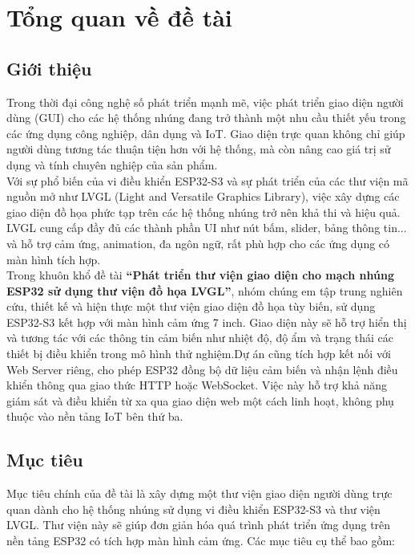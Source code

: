\chapter{Tổng quan về đề tài}
\section{Giới thiệu}
\tab Trong thời đại công nghệ số phát triển mạnh mẽ, việc phát triển giao diện người dùng (GUI) cho các hệ thống nhúng đang trở thành một nhu cầu thiết yếu trong các ứng dụng công nghiệp, dân dụng và IoT. Giao diện trực quan không chỉ giúp người dùng tương tác thuận tiện hơn với hệ thống, mà còn nâng cao giá trị sử dụng và tính chuyên nghiệp của sản phẩm.\\ 
\tab Với sự phổ biến của vi điều khiển ESP32-S3 và sự phát triển của các thư viện mã nguồn mở như LVGL (Light and Versatile Graphics Library), việc xây dựng các giao diện đồ họa phức tạp trên các hệ thống nhúng trở nên khả thi và hiệu quả. LVGL cung cấp đầy đủ các thành phần UI như nút bấm, slider, bảng thông tin... và hỗ trợ cảm ứng, animation, đa ngôn ngữ, rất phù hợp cho các ứng dụng có màn hình tích hợp.\\ 
\tab Trong khuôn khổ đề tài \textbf{“Phát triển thư viện giao diện cho mạch nhúng ESP32 sử dụng thư viện đồ họa LVGL”}, nhóm chúng em tập trung nghiên cứu, thiết kế và hiện thực một thư viện giao diện đồ họa tùy biến, sử dụng ESP32-S3 kết hợp với màn hình cảm ứng 7 inch. Giao diện này sẽ hỗ trợ hiển thị và tương tác với các thông tin cảm biến như nhiệt độ, độ ẩm và trạng thái các thiết bị điều khiển trong mô hình thử nghiệm.Dự án cũng tích hợp kết nối với Web Server riêng, cho phép ESP32 đồng bộ dữ liệu cảm biến và nhận lệnh điều khiển thông qua giao thức HTTP hoặc WebSocket. Việc này hỗ trợ khả năng giám sát và điều khiển từ xa qua giao diện web một cách linh hoạt, không phụ thuộc vào nền tảng IoT bên thứ ba.
\section{Mục tiêu}
\tab Mục tiêu chính của đề tài là xây dựng một thư viện giao diện người dùng trực quan dành cho hệ thống nhúng sử dụng vi điều khiển ESP32-S3 và thư viện LVGL. Thư viện này sẽ giúp đơn giản hóa quá trình phát triển ứng dụng trên nền tảng ESP32 có tích hợp màn hình cảm ứng. Các mục tiêu cụ thể bao gồm:

